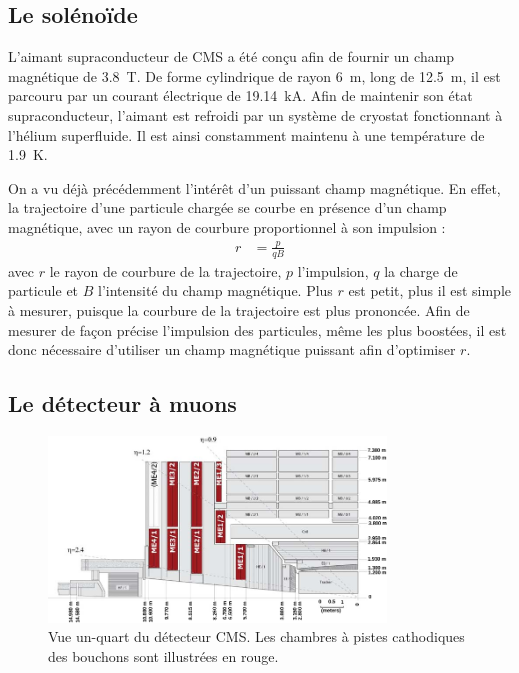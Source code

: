 
\subsection{Le solénoïde}

L'aimant supraconducteur de CMS a été conçu afin de fournir un champ magnétique de \SI{3.8}{\tesla}. De forme cylindrique de rayon \SI{6}{\m}, long de \SI{12.5}{\meter}, il est parcouru par un courant électrique de \SI{19.14}{\kilo\ampere}. Afin de maintenir son état supraconducteur, l'aimant est refroidi par un système de cryostat fonctionnant à l'hélium superfluide. Il est ainsi constamment maintenu à une température de \SI{1.9}{\kelvin}.

On a vu déjà précédemment l'intérêt d'un puissant champ magnétique. En effet, la trajectoire d'une particule chargée se courbe en présence d'un champ magnétique, avec un rayon de courbure proportionnel à son impulsion :
\begin{align*}
  r &= \frac{p}{qB}
\end{align*}
avec $r$ le rayon de courbure de la trajectoire, $p$ l'impulsion, $q$ la charge de particule et $B$ l'intensité du champ magnétique. Plus $r$ est petit, plus il est simple à mesurer, puisque la courbure de la trajectoire est plus prononcée. Afin de mesurer de façon précise l'impulsion des particules, même les plus boostées, il est donc nécessaire d'utiliser un champ magnétique puissant afin d'optimiser $r$.

\subsection{Le détecteur à muons}

\begin{figure}[tb] \centering
  \includegraphics[width=0.8\textwidth]{chapitre2/figs/CSC.pdf}
  \caption{Vue un-quart du détecteur CMS. Les chambres à pistes cathodiques des bouchons sont illustrées en rouge.}
  \label{fig:cms_csc}
\end{figure}


